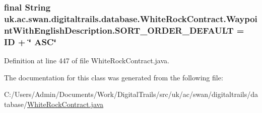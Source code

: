 \hypertarget{classuk_1_1ac_1_1swan_1_1digitaltrails_1_1database_1_1_white_rock_contract_1_1_waypoint_with_english_description_a43f80ce8328046e60bb9bd878a0ee547}{
\subsubsection[{S\+O\+R\+T\+\_\+\+O\+R\+D\+E\+R\+\_\+\+D\+E\+F\+A\+U\+L\+T}]{\setlength{\rightskip}{0pt plus 5cm}final String uk.\+ac.\+swan.\+digitaltrails.\+database.\+White\+Rock\+Contract.\+Waypoint\+With\+English\+Description.\+S\+O\+R\+T\+\_\+\+O\+R\+D\+E\+R\+\_\+\+D\+E\+F\+A\+U\+L\+T = I\+D + \char`\"{} A\+S\+C\char`\"{}\hspace{0.3cm}{\ttfamily [static]}}}\label{classuk_1_1ac_1_1swan_1_1digitaltrails_1_1database_1_1_white_rock_contract_1_1_waypoint_with_english_description_a43f80ce8328046e60bb9bd878a0ee547}


Definition at line 447 of file White\+Rock\+Contract.\+java.



The documentation for this class was generated from the following file\+:\begin{DoxyCompactItemize}
\item 
C\+:/\+Users/\+Admin/\+Documents/\+Work/\+Digital\+Trails/src/uk/ac/swan/digitaltrails/database/\hyperlink{_white_rock_contract_8java}{White\+Rock\+Contract.\+java}\end{DoxyCompactItemize}
